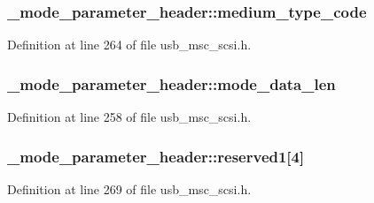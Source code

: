 \subsubsection[{\texorpdfstring{medium\+\_\+type\+\_\+code}{medium_type_code}}]{ \+\_\+mode\+\_\+parameter\+\_\+header\+::medium\+\_\+type\+\_\+code}\hypertarget{struct__mode__parameter__header_a03d4adbac0172fc400d2f406d100ddbe}{}\label{struct__mode__parameter__header_a03d4adbac0172fc400d2f406d100ddbe}


Definition at line 264 of file usb\+\_\+msc\+\_\+scsi.\+h.

\subsubsection[{\texorpdfstring{mode\+\_\+data\+\_\+len}{mode_data_len}}]{ \+\_\+mode\+\_\+parameter\+\_\+header\+::mode\+\_\+data\+\_\+len}\hypertarget{struct__mode__parameter__header_afaa5757800de8759d8eadfb3ddbd95cf}{}\label{struct__mode__parameter__header_afaa5757800de8759d8eadfb3ddbd95cf}


Definition at line 258 of file usb\+\_\+msc\+\_\+scsi.\+h.

\subsubsection[{\texorpdfstring{reserved1}{reserved1}}]{ \+\_\+mode\+\_\+parameter\+\_\+header\+::reserved1\mbox{[}4\mbox{]}}\hypertarget{struct__mode__parameter__header_a02b311a65b94cc5299907119a9f6584e}{}\label{struct__mode__parameter__header_a02b311a65b94cc5299907119a9f6584e}


Definition at line 269 of file usb\+\_\+msc\+\_\+scsi.\+h.

